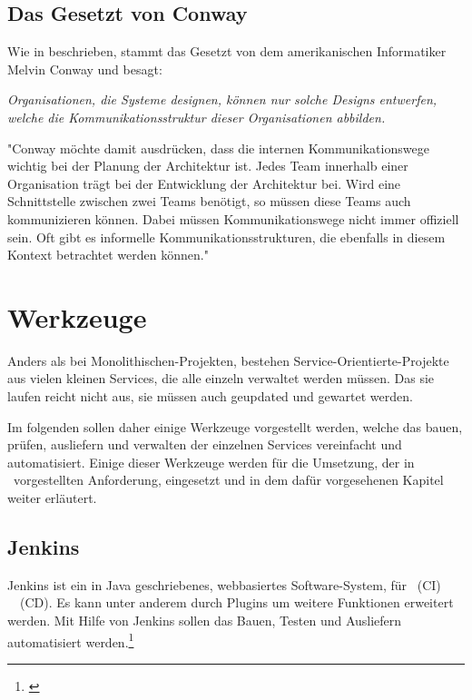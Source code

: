 \subsection{Das Gesetzt von Conway}
\label{subsec:conway}
Wie in \cite[S. 39 ff.]{EWolff2016:Microservices} beschrieben, stammt das Gesetzt von dem amerikanischen Informatiker Melvin Conway und besagt:
\begin{center}
    \textit{Organisationen, die Systeme designen, können nur solche Designs entwerfen, welche die Kommunikationsstruktur dieser Organisationen abbilden.}
\end{center}
"Conway möchte damit ausdrücken, dass die internen Kommunikationswege wichtig bei der Planung der Architektur ist. Jedes Team innerhalb einer Organisation trägt bei der Entwicklung der Architektur bei. Wird eine Schnittstelle zwischen zwei Teams benötigt, so müssen diese Teams auch kommunizieren können. Dabei müssen Kommunikationswege nicht immer offiziell sein. Oft gibt es informelle Kommunikationsstrukturen, die ebenfalls in diesem Kontext betrachtet werden können." \cite[vg. S. 39]{EWolff2016:Microservices}

\section{Werkzeuge}
\label{sec:werkzeuge}
Anders als bei Monolithischen-Projekten, bestehen Service-Orientierte-Projekte aus vielen kleinen Services, die alle einzeln verwaltet werden müssen. Das sie laufen reicht nicht aus, sie müssen auch geupdated und gewartet werden.

Im folgenden sollen daher einige Werkzeuge vorgestellt werden, welche das bauen, prüfen, ausliefern und verwalten der einzelnen Services vereinfacht und automatisiert. Einige dieser Werkzeuge werden für die Umsetzung, der in \ vorgestellten Anforderung, eingesetzt und in dem dafür vorgesehenen Kapitel weiter erläutert.

\subsection{Jenkins}
\label{subsec:jenkins}
Jenkins ist ein in Java geschriebenes, webbasiertes Software-System, für \ci\ (CI) \ \cd\ (CD). Es kann unter anderem durch Plugins um weitere Funktionen erweitert werden. Mit Hilfe von Jenkins sollen das Bauen, Testen und Ausliefern automatisiert werden.\footnote{\cite[vgl. S. 98 ff.]{EWolff2015:ContinuouosDelivery}}

